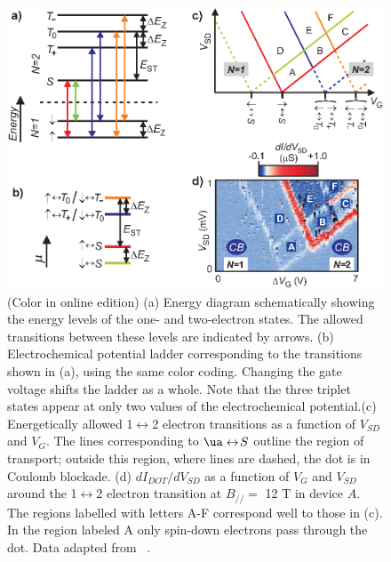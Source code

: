 \documentclass[12pt,aps,nofootinbib]{revtex4-1}
\begin{document}
\begin{figure}[htb]
\includegraphics[width=14cm]{hanson_fig08.eps}
\caption{(Color in online edition) (a) Energy diagram schematically showing the energy
levels of the one- and two-electron states. The allowed
transitions between these levels are indicated by arrows. (b)
Electrochemical potential ladder corresponding to the transitions
shown in (a), using the same color coding. Changing the gate
voltage shifts the ladder as a whole. Note that the three triplet
states appear at only two values of the electrochemical
potential.(c) Energetically allowed 1$\leftrightarrow$2 electron
transitions as a function of $V_{SD}$ and $V_{G}$. The lines
corresponding to $\ua\leftrightarrow\!S$ outline the region of
transport; outside this region, where lines are dashed, the dot is
in Coulomb blockade. (d) $dI_{DOT}/dV_{SD}$ as a function of $V_G$
and $V_{SD}$ around the 1$\leftrightarrow$2 electron transition at
$B_{/\!/}\!=\!$ 12 T in device $A$. The regions labelled with
letters A-F correspond well to those in (c). In the region labeled
A only spin-down electrons pass through the dot. Data adapted from
~\textcite{HansonPRB2004}.} \label{Fig:N1-2}
\end{figure}
\end{document}
